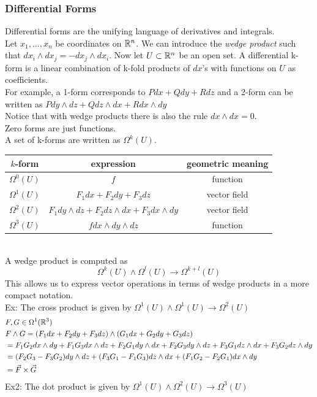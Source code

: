 \documentclass[11pt, fleqn]{article}
\begin{document}
\subsubsection{Differential Forms}
Differential forms are the unifying language of derivatives and integrals.\\
Let $x_1,\ldots,x_n$ be coordinates on $\mathbb{R}^n$. We can introduce the \textit{wedge product} such that $dx_i\wedge dx_j=-dx_j\wedge dx_i$. Now let $U\subset\mathbb{R}^n$ be an open set. A differential k-form is a linear combination of k-fold products of $dx$'s with functions on $U$ as coefficients.\\
For example, a 1-form corresponds to $Pdx+Qdy+Rdz$ and a 2-form can be written as $Pdy\wedge dz+Qdz\wedge dx+Rdx\wedge dy$\\
Notice that with wedge products there is also the rule $dx\wedge dx=0$.\\
Zero forms are just functions.\\
A set of k-forms are written as $\Omega^k(U)$.\\
\begin{tabular}{c|c|c}
    $k$-form & expression & geometric meaning\\
    \hline
    $\Omega^0(U)$ & $f$ & function\\
    $\Omega^1(U)$ & $F_1dx+F_2dy+F_3dz$ & vector field\\
    $\Omega^2(U)$ & $F_1dy\wedge dz+F_2dz\wedge dx+F_3dx\wedge dy$ & vector field\\
    $\Omega^3(U)$ & $fdx\wedge dy\wedge dz$ & function
\end{tabular}\\
A wedge product is computed as 
$$\Omega^k(U)\wedge\Omega^l(U)\to\Omega^{k+l}(U)$$
This allows us to express vector operations in terms of wedge products in a more compact notation.\\
Ex: The cross product is given by $\Omega^1(U)\wedge\Omega^1(U)\to\Omega^2(U)$
\begin{align*}
    &F,G\in\Omega^1(\mathbb{R}^3)\\
    &F\wedge G=(F_1dx+F_2dy+F_3dz)\wedge(G_1dx+G_2dy+G_3dz)\\
    &=F_1G_2dx\wedge dy+F_1G_3dx\wedge dz+F_2G_1dy\wedge dx+F_2G_3dy\wedge dz+F_3G_1dz\wedge dx+F_3G_2dz\wedge dy\\
    &=(F_2G_3-F_3G_2)dy\wedge dz+(F_3G_1-F_1G_3)dz\wedge dx+(F_1G_2-F_2G_1)dx\wedge dy\\
    &=\vec{F}\times\vec{G}
\end{align*}
Ex2: The dot product is given by $\Omega^1(U)\wedge\Omega^2(U)\to\Omega^3(U)$
\end{document}
